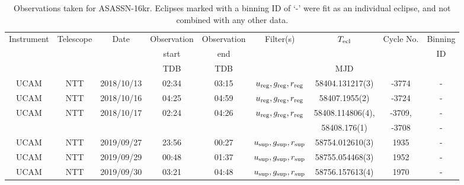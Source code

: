 \begin{table}
    \begin{center}
        \caption{Observations taken for ASASSN-16kr. Eclipses marked with a binning ID of `-' were fit as an individual eclipse, and not combined with any other data.}
        \label{table:observing:observation logs ASASSN-16kr}
		\begin{tabular}{ccccccccc}
			\hline
			Instrument & Telescope & Date & Observation  & Observation  & Filter(s) & $T_{\rm ecl}$ & Cycle No. & Binning \\
			 &  &  &  start &  end &  &  &  & ID \\
			 &  &  & TDB & TDB &  & MJD &  &  \\
            \hline
            \hline
            UCAM & NTT & 2018/10/13 & 02:34 & 03:15 & $u_{\rm reg},g_{\rm reg},r_{\rm reg}$ & 58404.131217(3)  & -3774 & - \\
            UCAM & NTT & 2018/10/16 & 04:25 & 04:59 & $u_{\rm reg},g_{\rm reg},r_{\rm reg}$ & 58407.1955(2)    & -3724 & - \\
            UCAM & NTT & 2018/10/17 & 02:24 & 04:26 & $u_{\rm reg},g_{\rm reg},r_{\rm reg}$ & 58408.114806(4), & -3709,& - \\
                 &     &            &       &       &                                       &  58408.176(1)    & -3708 & - \\
            UCAM & NTT & 2019/09/27 & 23:56 & 00:27 & $u_{\rm sup},g_{\rm sup},r_{\rm sup}$ & 58754.012610(3)  & 1935  & - \\
            UCAM & NTT & 2019/09/29 & 00:48 & 01:37 & $u_{\rm sup},g_{\rm sup},r_{\rm sup}$ & 58755.054468(3)  & 1952  & - \\
            UCAM & NTT & 2019/09/30 & 03:21 & 04:48 & $u_{\rm sup},g_{\rm sup},r_{\rm sup}$ & 58756.157613(4)  & 1970  & - \\
            \hline
        \end{tabular}
    \end{center}
\end{table}